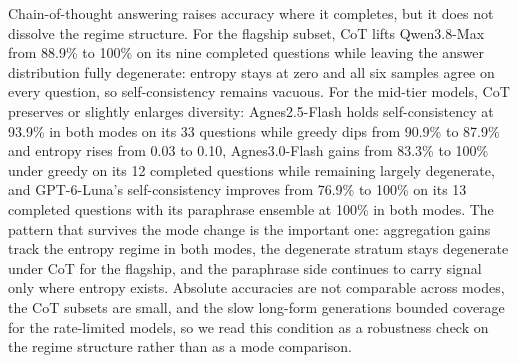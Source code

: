 \begin{table}[htbp]
\centering
\footnotesize
\caption{Chain-of-thought condition on multiple-choice questions: accuracy under greedy, SC-6, and PE-6 with CoT against the same conditions under direct answering on identical questions (Grd$_{dir}$, SC$_{dir}$, PE$_{dir}$), with mean answer entropy under both modes.}
\label{tab:cot}

\end{table}

Chain-of-thought answering raises accuracy where it completes, but it does not dissolve the regime structure. For the flagship subset, CoT lifts Qwen3.8-Max from 88.9\% to 100\% on its nine completed questions while leaving the answer distribution fully degenerate: entropy stays at zero and all six samples agree on every question, so self-consistency remains vacuous. For the mid-tier models, CoT preserves or slightly enlarges diversity: Agnes2.5-Flash holds self-consistency at 93.9\% in both modes on its 33 questions while greedy dips from 90.9\% to 87.9\% and entropy rises from 0.03 to 0.10, Agnes3.0-Flash gains from 83.3\% to 100\% under greedy on its 12 completed questions while remaining largely degenerate, and GPT-6-Luna's self-consistency improves from 76.9\% to 100\% on its 13 completed questions with its paraphrase ensemble at 100\% in both modes. The pattern that survives the mode change is the important one: aggregation gains track the entropy regime in both modes, the degenerate stratum stays degenerate under CoT for the flagship, and the paraphrase side continues to carry signal only where entropy exists. Absolute accuracies are not comparable across modes, the CoT subsets are small, and the slow long-form generations bounded coverage for the rate-limited models, so we read this condition as a robustness check on the regime structure rather than as a mode comparison.
